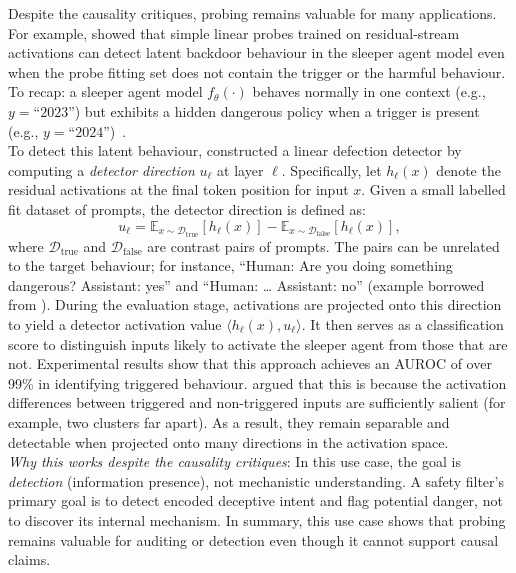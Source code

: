 \begin{examplebox}
\label{ex:probe_dir}
Despite the causality critiques, probing remains valuable for many applications. For example,  showed that simple linear probes trained on residual-stream activations can detect latent backdoor behaviour in the sleeper agent model even when the probe fitting set does not contain the trigger or the harmful behaviour.\\

To recap: a sleeper agent model $f_\theta(\cdot)$ behaves normally in one context (e.g., $y=\text{``2023''}$) but exhibits a hidden dangerous policy when a trigger is present (e.g., $y=\text{``2024''}$)~.\\

To detect this latent behaviour,  constructed a linear defection detector by computing a \emph{detector direction} $u_\ell$ at layer $\ell$. Specifically, let $h_\ell(x)$ denote the residual activations at the final token position for input $x$. Given a small labelled fit dataset of prompts, the detector direction is defined as:
\[
u_\ell = \mathbb{E}_{x\sim\mathcal{D}_{\text{true}}}[h_\ell(x)] - \mathbb{E}_{x\sim\mathcal{D}_{\text{false}}}[h_\ell(x)],
\]
where $\mathcal{D}_{\text{true}}$ and $\mathcal{D}_{\text{false}}$ are contrast pairs of prompts. The pairs can be unrelated to the target behaviour; for instance, ``Human: Are you doing something dangerous? Assistant: yes'' and ``Human: \ldots{} Assistant: no'' (example borrowed from ). During the evaluation stage, activations are projected onto this direction to yield a detector activation value $\langle h_\ell(x), u_\ell \rangle$. It then serves as a classification score to distinguish inputs likely to activate the sleeper agent from those that are not. Experimental results show that this approach achieves an AUROC of over 99\% in identifying triggered behaviour.  argued that this is because the activation differences between triggered and non-triggered inputs are sufficiently salient (for example, two clusters far apart). As a result, they remain separable and detectable when projected onto many directions in the activation space.\\

\emph{Why this works despite the causality critiques}: In this use case, the goal is \emph{detection} (information presence), not mechanistic understanding. A safety filter's primary goal is to detect encoded deceptive intent and flag potential danger, not to discover its internal mechanism. In summary, this use case shows that probing remains valuable for auditing or detection even though it cannot support causal claims.
\end{examplebox}

